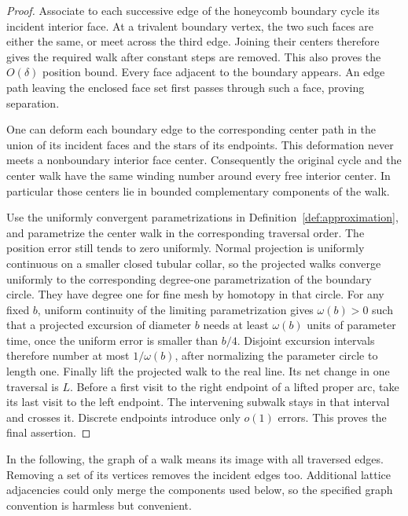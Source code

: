 \begin{proof}
Associate to each successive edge of the honeycomb boundary cycle its
incident interior face.  At a trivalent boundary vertex, the two such
faces are either the same, or meet across the third edge.  Joining their
centers therefore gives the required walk after constant steps are
removed.  This also proves the $O(\delta)$ position bound.  Every face
adjacent to the boundary appears.  An edge path leaving the enclosed
face set first passes through such a face, proving separation.

One can deform each boundary edge to the corresponding center path in
the union of its incident faces and the stars of its endpoints.  This
deformation never meets a nonboundary interior face center.  Consequently
the original cycle and the center walk have the same winding number
around every free interior center.  In particular those centers lie in
bounded complementary components of the walk.

Use the uniformly convergent parametrizations in
Definition~\ref{def:approximation}, and parametrize the center walk in
the corresponding traversal order.  The position error still tends to
zero uniformly.  Normal projection is uniformly continuous on a smaller
closed tubular collar, so the projected walks converge uniformly to the
corresponding degree-one parametrization of the boundary circle.  They
have degree one for fine mesh by homotopy in that circle.  For any fixed
$b$, uniform continuity of the limiting parametrization gives
$\omega(b)>0$ such that a projected excursion of diameter $b$ needs at
least $\omega(b)$ units of parameter time, once the uniform error is
smaller than $b/4$.  Disjoint excursion intervals therefore number at
most $1/\omega(b)$, after normalizing the parameter circle to length one.
Finally lift the projected walk to the real line.  Its net change in
one traversal is $L$.  Before a first visit to the right endpoint of
a lifted proper arc, take its last visit to the left endpoint.  The
intervening subwalk stays in that interval and crosses it.  Discrete
endpoints introduce only $o(1)$ errors.  This proves the final assertion.
\end{proof}

In the following, the graph of a walk means its image with all traversed
edges.  Removing a set of its vertices removes the incident edges too.
Additional lattice adjacencies could only merge the components used
below, so the specified graph convention is harmless but convenient.

